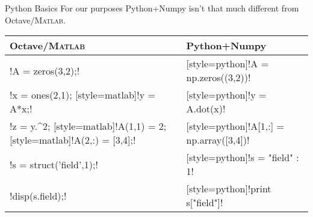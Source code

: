 \documentclass[xcolor=dvipsnames]{beamer}
\providecommand{\lstinline}{} %
\begin{document}
\begin{frame}[fragile]{Python Basics}
    For our purposes Python+Numpy isn't that much different from Octave/\textsc{Matlab}.
    
    \begin{center}
        \begin{tabular}{ll}
            \toprule
            Octave/\textsc{Matlab} & Python+Numpy \\
            \midrule
            \lstinline[style=matlab]!A = zeros(3,2);! & \lstinline[style=python]!A = np.zeros((3,2))! \\
            \lstinline[style=matlab]!x = ones(2,1); %  2D.! & \lstinline[style=python]!x = np.ones((2,)) #  1D.! \\
            \lstinline[style=matlab]!y = A*x;! & \lstinline[style=python]!y = A.dot(x)! \\
            \lstinline[style=matlab]!z = y.^2; %  Elementwise.! & \lstinline[style=python]!z = y**2 #  Elementwise.! \\
            \lstinline[style=matlab]!A(1,1) = 2; %  One-based.! & \lstinline[style=python]!A[0,0] = 2 #  Zero-based.! \\
            \lstinline[style=matlab]!A(2,:) = [3,4];! & \lstinline[style=python]!A[1,:] = np.array([3,4])! \\
            \lstinline[style=matlab]!s = struct('field',1);! & \lstinline[style=python]!s = {"field"  : 1}! \\
            \lstinline[style=matlab]!disp(s.field);! & \lstinline[style=python]!print s["field"]! \\
            \bottomrule
        \end{tabular}
    \end{center}
    
\end{frame}
\end{document}
